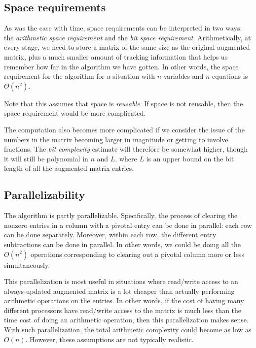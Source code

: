 \documentclass[10pt]{amsart}
\begin{document}
\subsection{Space requirements}

As was the case with time, space requirements can be interpreted in
two ways: the {\em arithmetic space requirement} and the {\em bit
  space requirement}. Arithmetically, at every stage, we need to store
a matrix of the same size as the original augmented matrix, plus a
much smaller amount of tracking information that helps us remember how
far in the algorithm we have gotten. In other words, the space
requirement for the algorithm for a situation with $n$ variables and
$n$ equations is $\Theta(n^2)$.

Note that this assumes that space is {\em reusable}. If space is not
reusable, then the space requirement would be more complicated.

The computation also becomes more complicated if we consider the issue
of the numbers in the matrix becoming larger in magnitude or getting
to involve fractions. The {\em bit complexity} estimate will therefore
be somewhat higher, though it will still be polynomial in $n$ and $L$,
where $L$ is an upper bound on the bit length of all the augmented
matrix entries.

\subsection{Parallelizability}

The algorithm is partly parallelizable. Specifically, the process of
clearing the nonzero entries in a column with a pivotal entry can be
done in parallel: each row can be done separately. Moreover, within
each row, the different entry subtractions can be done in parallel. In
other words, we could be doing all the $O(n^2)$ operations
corresponding to clearing out a pivotal column more or less
simultaneously.

This parallelization is most useful in situations where read/write
access to an always-updated augmented matrix is a lot cheaper than
actually performing arithmetic operations on the entries. In other
words, if the cost of having many different processors have read/write
access to the matrix is much less than the time cost of doing an
arithmetic operation, then this parallelization makes sense. With such
parallelization, the total arithmetic complexity could become as low
as $O(n)$. However, these assumptions are not typically realistic.
\end{document}
